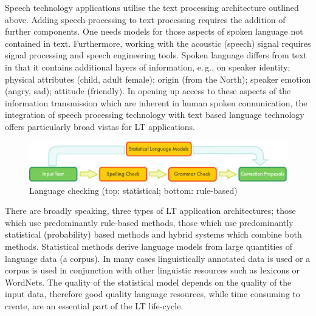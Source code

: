 \begin{multicols}{2}
Speech technology applications utilise the text processing architecture outlined above. Adding speech processing to text processing requires the addition of further components. One needs models for those aspects of spoken  language not contained in text. Furthermore, working with the acoustic (speech) signal requires signal processing and speech engineering tools. Spoken language differs from text in that it contains additional layers of information, e.\,g., on speaker identity; physical attributes (child, adult female); origin (from the North); speaker emotion (angry, sad); attitude (friendly). In opening up access to these aspects of the information transmission which are inherent in human spoken connunication, the integration of speech processing technology with text based language technology offers particularly broad vistas for LT applications.

\begin{figure}[hb]
  \center
  \includegraphics[width=\textwidth]{../_media/english/language_checking}
  \caption{Language checking (top: statistical; bottom: rule-based)}
\label{fig:langcheckingaarch_en}
\end{figure}

There are broadly speaking, three types of LT application architectures; those which use predominantly rule-based methods, those which use predominantly statistical (probability) based methods and hybrid systems which combine both methods. Statistical methods derive language models from  large quantities of language data (a corpus). In many cases linguistically annotated data is used or a corpus is used in conjunction with other linguistic resources such as lexicons or WordNets. The quality of the statistical model depends on the quality of the input data, therefore good quality language resources, while time consuming to create, are an essential part of the LT life-cycle. 


\end{multicols}
